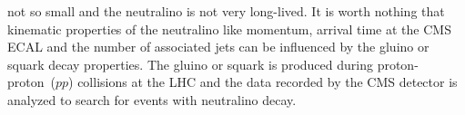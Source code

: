 {{not so small and the neutralino is not very long-lived.
It is worth nothing that kinematic properties of the neutralino like momentum, arrival time at the CMS ECAL and the number of associated jets can be influenced by the gluino or squark decay properties.
The gluino or squark is produced during proton-proton~($pp$) collisions at the LHC and the data recorded by the CMS detector is analyzed to search for events with neutralino decay.


}}
